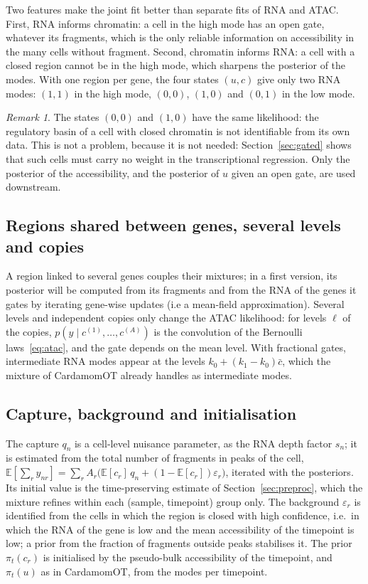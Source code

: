 \documentclass[a4paper, 11pt]{article}
\newcommand{\E}{\mathbb{E}}
\newcommand{\cbar}{\bar c}
\theoremstyle{plain}
\theoremstyle{remark}
\newtheorem{rem}{Remark}
\begin{document}
Two features make the joint fit better than separate fits of RNA and ATAC. First, RNA informs chromatin: a cell in the high mode has an open gate, whatever its fragments, which is the only reliable information on accessibility in the many cells without fragment. Second, chromatin informs RNA: a cell with a closed region cannot be in the high mode, which sharpens the posterior of the modes. With one region per gene, the four states $(u, c)$ give only two RNA modes: $(1,1)$ in the high mode, $(0,0)$, $(1,0)$ and $(0,1)$ in the low mode.

\begin{rem}\label{rem:ident}
The states $(0,0)$ and $(1,0)$ have the same likelihood: the regulatory basin of a cell with closed chromatin is not identifiable from its own data. This is not a problem, because it is not needed: Section~\ref{sec:gated} shows that such cells must carry no weight in the transcriptional regression. Only the posterior of the accessibility, and the posterior of $u$ given an open gate, are used downstream.
\end{rem}

\subsection{Regions shared between genes, several levels and copies}

A region linked to several genes couples their mixtures; in a first version, its posterior will be computed from its fragments and from the RNA of the genes it gates by iterating gene-wise updates (i.e a mean-field approximation). Several levels and independent copies only change the ATAC likelihood: for levels $\ell$ of the copies, $p(y \mid c^{(1)}, \dots, c^{(A)})$ is the convolution of the Bernoulli laws~\eqref{eq:atac}, and the gate depends on the mean level. With fractional gates, intermediate RNA modes appear at the levels $k_0 + (k_1 - k_0)\cbar$, which the mixture of CardamomOT already handles as intermediate modes.

\subsection{Capture, background and initialisation}

The capture $q_n$ is a cell-level nuisance parameter, as the RNA depth factor $s_n$; it is estimated from the total number of fragments in peaks of the cell, $\E[\sum_r y_{nr}] = \sum_r A_r\bigl(\E[c_r]\,q_n + (1 - \E[c_r])\varepsilon_r\bigr)$, iterated with the posteriors. Its initial value is the time-preserving estimate of Section~\ref{sec:preproc}, which the mixture refines within each (sample, timepoint) group only. The background $\varepsilon_r$ is identified from the cells in which the region is closed with high confidence, i.e.\ in which the RNA of the gene is low and the mean accessibility of the timepoint is low; a prior from the fraction of fragments outside peaks stabilises it. The prior $\pi_t(c_r)$ is initialised by the pseudo-bulk accessibility of the timepoint, and $\pi_t(u)$ as in CardamomOT, from the modes per timepoint.
\end{document}
